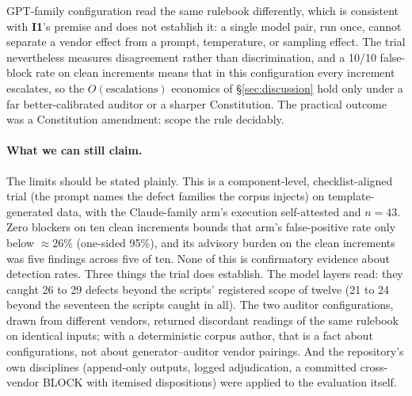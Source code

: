 \documentclass[11pt,letterpaper]{article}
\newcommand{\invariant}[1]{\textbf{I#1}}
\begin{document}
GPT-family configuration read the same rulebook differently, which is consistent with \invariant{1}'s premise and does not establish it: a single model pair, run once, cannot separate a vendor effect from a prompt, temperature, or sampling effect. The trial nevertheless measures disagreement rather than discrimination, and a 10/10 false-block rate on clean increments means that in this configuration every increment escalates, so the $O(\text{escalations})$ economics of \S\ref{sec:discussion} hold only under a far better-calibrated auditor or a sharper Constitution. The practical outcome was a Constitution amendment: scope the rule decidably.

\paragraph{What we can still claim.} The limits should be stated plainly. This is a component-level, checklist-aligned trial (the prompt names the defect families the corpus injects) on template-generated data, with the Claude-family arm's execution self-attested and $n{=}43$. Zero blockers on ten clean increments bounds that arm's false-positive rate only below ${\approx}26\%$ (one-sided 95\%), and its advisory burden on the clean increments was five findings across five of ten. None of this is confirmatory evidence about detection rates. Three things the trial does establish. The model layers read: they caught 26 to 29 defects beyond the scripts' registered scope of twelve (21 to 24 beyond the seventeen the scripts caught in all). The two auditor configurations, drawn from different vendors, returned discordant readings of the same rulebook on identical inputs; with a deterministic corpus author, that is a fact about configurations, not about generator--auditor vendor pairings. And the repository's own disciplines (append-only outputs, logged adjudication, a committed cross-vendor BLOCK with itemised dispositions) were applied to the evaluation itself.
\end{document}

